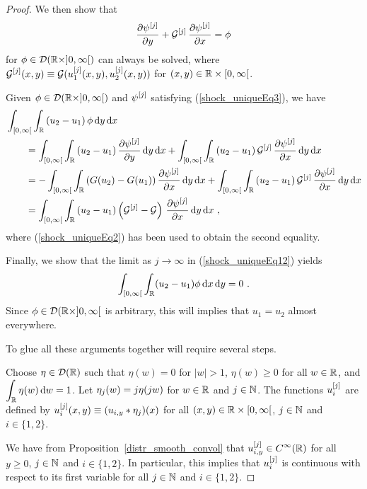 \begin{proof}
We then show that
\begin{equation} \label{shock_uniqueEq3}
\frac{\partial{\psi^{[j]}}}{\partial y} + {\cal G}^{[j]}\,\frac{\partial{\psi^{[j]}}}{\partial x} = \phi
\end{equation}
for $\phi \in \mathcal{D}(\mathbb{R}\times ]0,\infty[)$ can always be solved, where
$\displaystyle {\cal G}^{[j]}(x,y) \equiv
{\cal G}(u^{[j]}_1(x,y),u^{[j]}_2(x,y))$
for $(x,y) \in \mathbb{R} \times [0,\infty[$.

Given $\phi \in \mathcal{D}(\mathbb{R}\times ]0,\infty[)$ and $\displaystyle \psi^{[j]}$
satisfying (\ref{shock_uniqueEq3}), we have
\begin{align}
&\int_{[0,\infty[} \int_{\mathbb{R}}
\left(u_2 - u_1 \right) \phi \,\mathrm{d}{y} \,\mathrm{d}{x} \nonumber \\
&\qquad = \int_{[0,\infty[} \int_{\mathbb{R}}
\left(u_2 - u_1 \right) \frac{\partial{\psi^{[j]}}}{\partial y} \,\mathrm{d}{y} \,\mathrm{d}{x}
+ \int_{[0,\infty[} \int_{\mathbb{R}}
\left(u_2 - u_1 \right) {\cal G}^{[j]}\,\frac{\partial{\psi^{[j]}}}{\partial x}  \,\mathrm{d}{y} \,\mathrm{d}{x}
\nonumber \\ 
&\qquad = - \int_{[0,\infty[} \int_{\mathbb{R}}
\left(G(u_2) - G(u_1) \right) \frac{\partial{\psi^{[j]}}}{\partial x} \,\mathrm{d}{y} \,\mathrm{d}{x}
+ \int_{[0,\infty[} \int_{\mathbb{R}}
\left(u_2 - u_1 \right) {\cal G}^{[j]}\,\frac{\partial{\psi^{[j]}}}{\partial x}  \,\mathrm{d}{y} \,\mathrm{d}{x}
\nonumber \\ 
&\qquad = \int_{[0,\infty[} \int_{\mathbb{R}}
\left(u_2 - u_1 \right)\left({\cal G}^{[j]} - {\cal G}\right)
\,\frac{\partial{\psi^{[j]}}}{\partial x} \,\mathrm{d}{y} \,\mathrm{d}{x} \ ,  \label{shock_uniqueEq12}
\end{align}
where (\ref{shock_uniqueEq2}) has been used to obtain the second
equality.

Finally, we show that the limit as $j\to \infty$ in
(\ref{shock_uniqueEq12}) yields
\[
\int_{[0,\infty[} \int_{\mathbb{R}} (u_2-u_1) \phi \,\mathrm{d}{x}\,\mathrm{d}{y} = 0 \ .
\]
Since $\phi \in \mathcal{D}(\mathbb{R}\times ]0,\infty[$ is arbitrary, this will
implies that $u_1 = u_2$ almost everywhere.

To glue all these arguments together will require several steps.

  Choose $\displaystyle \eta \in \mathcal{D}(\mathbb{R})$ such that
$\eta(w) = 0$ for $|w|>1$, $\eta(w) \geq 0$ for all $w\in \mathbb{R}$, and
$\displaystyle \int_{\mathbb{R}} \eta(w)\,\mathrm{d}{w} = 1$.
Let $\displaystyle \eta_j(w) = j \eta(j w)$ for
$w \in \mathbb{R}$ and $j \in \mathbb{N}$.  The functions $\displaystyle u_i^{[j]}$
are defined by $\displaystyle u_i^{[j]}(x,y) \equiv (u_{i,y} \ast \eta_j)(x)$
for all $(x,y) \in \mathbb{R}\times [0,\infty[$, $j\in \mathbb{N}$ and $i \in \{1,2\}$.

We have from Proposition~\ref{distr_smooth_convol} that
$\displaystyle u_{i,y}^{[j]} \in C^\infty(\mathbb{R})$ for all $y \geq 0$,
$j \in \mathbb{N}$ and $i\in \{1,2\}$.  In particular, this implies that
$\displaystyle u_{i}^{[j]}$ is continuous with respect to its first
variable for all $j \in \mathbb{N}$ and $i\in \{1,2\}$.


\end{proof}
